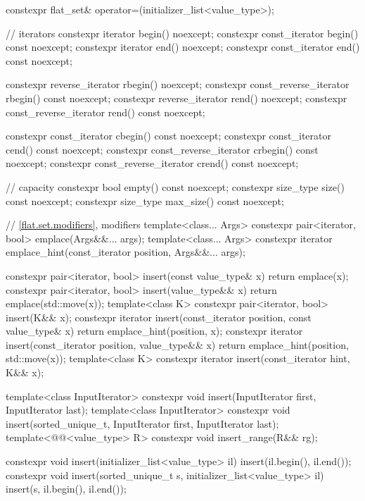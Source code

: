 \begin{codeblock}
{{    constexpr flat_set& operator=(initializer_list<value_type>);

    // iterators
    constexpr iterator               begin() noexcept;
    constexpr const_iterator         begin() const noexcept;
    constexpr iterator               end() noexcept;
    constexpr const_iterator         end() const noexcept;

    constexpr reverse_iterator       rbegin() noexcept;
    constexpr const_reverse_iterator rbegin() const noexcept;
    constexpr reverse_iterator       rend() noexcept;
    constexpr const_reverse_iterator rend() const noexcept;

    constexpr const_iterator         cbegin() const noexcept;
    constexpr const_iterator         cend() const noexcept;
    constexpr const_reverse_iterator crbegin() const noexcept;
    constexpr const_reverse_iterator crend() const noexcept;

    // capacity
    constexpr bool empty() const noexcept;
    constexpr size_type size() const noexcept;
    constexpr size_type max_size() const noexcept;

    // \ref{flat.set.modifiers}, modifiers
    template<class... Args> constexpr pair<iterator, bool> emplace(Args&&... args);
    template<class... Args>
      constexpr iterator emplace_hint(const_iterator position, Args&&... args);

    constexpr pair<iterator, bool> insert(const value_type& x)
      { return emplace(x); }
    constexpr pair<iterator, bool> insert(value_type&& x)
      { return emplace(std::move(x)); }
    template<class K> constexpr pair<iterator, bool> insert(K&& x);
    constexpr iterator insert(const_iterator position, const value_type& x)
      { return emplace_hint(position, x); }
    constexpr iterator insert(const_iterator position, value_type&& x)
      { return emplace_hint(position, std::move(x)); }
    template<class K> constexpr iterator insert(const_iterator hint, K&& x);

    template<class InputIterator>
      constexpr void insert(InputIterator first, InputIterator last);
    template<class InputIterator>
      constexpr void insert(sorted_unique_t, InputIterator first, InputIterator last);
    template<@@<value_type> R>
      constexpr void insert_range(R&& rg);

    constexpr void insert(initializer_list<value_type> il)
      { insert(il.begin(), il.end()); }
    constexpr void insert(sorted_unique_t s, initializer_list<value_type> il)
      { insert(s, il.begin(), il.end()); }

}}
\end{codeblock}
